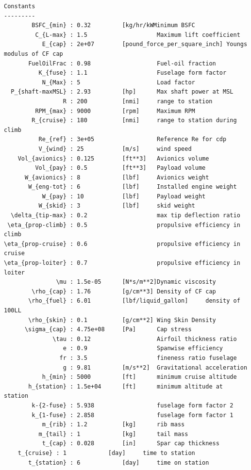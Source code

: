 \documentclass[10pt, a4paper]{article}
\begin{document}
\begin{verbatim}
Constants
---------
        BSFC_{min} : 0.32         [kg/hr/kWMinimum BSFC     
         C_{L-max} : 1.5                    Maximum lift coefficient     
           E_{cap} : 2e+07        [pound_force_per_square_inch] Youngs modulus of CF cap     
       FuelOilFrac : 0.98                   Fuel-oil fraction        
          K_{fuse} : 1.1                    Fuselage form factor     
           N_{Max} : 5                      Load factor      
  P_{shaft-maxMSL} : 2.93         [hp]      Max shaft power at MSL     
                 R : 200          [nmi]     range to station     
         RPM_{max} : 9000         [rpm]     Maximum RPM      
        R_{cruise} : 180          [nmi]     range to station during climb  
          Re_{ref} : 3e+05                  Reference Re for cdp     
          V_{wind} : 25           [m/s]     wind speed     
    Vol_{avionics} : 0.125        [ft**3]   Avionics volume      
         Vol_{pay} : 0.5          [ft**3]   Payload volume     
      W_{avionics} : 8            [lbf]     Avionics weight      
       W_{eng-tot} : 6            [lbf]     Installed engine weight      
           W_{pay} : 10           [lbf]     Payload weight     
          W_{skid} : 3            [lbf]     skid weight      
  \delta_{tip-max} : 0.2                    max tip deflection ratio     
 \eta_{prop-climb} : 0.5                    propulsive efficiency in climb 
\eta_{prop-cruise} : 0.6                    propulsive efficiency in cruise
\eta_{prop-loiter} : 0.7                    propulsive efficiency in loiter
               \mu : 1.5e-05      [N*s/m**2]Dynamic viscosity        
        \rho_{cap} : 1.76         [g/cm**3] Density of CF cap        
       \rho_{fuel} : 6.01         [lbf/liquid_gallon]     density of 100LL     
       \rho_{skin} : 0.1          [g/cm**2] Wing Skin Density        
      \sigma_{cap} : 4.75e+08     [Pa]      Cap stress     
              \tau : 0.12                   Airfoil thickness ratio      
                 e : 0.9                    Spanwise efficiency      
                fr : 3.5                    fineness ratio fuselage      
                 g : 9.81         [m/s**2]  Gravitational acceleration     
           h_{min} : 5000         [ft]      minimum cruise altitude      
       h_{station} : 1.5e+04      [ft]      minimum altitude at station    
        k-{2-fuse} : 5.938                  fuselage form factor 2     
        k_{1-fuse} : 2.858                  fuselage form factor 1     
           m_{rib} : 1.2          [kg]      rib mass       
          m_{tail} : 1            [kg]      tail mass      
           t_{cap} : 0.028        [in]      Spar cap thickness       
	t_{cruise} : 1            [day]     time to station      
       t_{station} : 6            [day]     time on station 

\end{verbatim}
\end{document}
